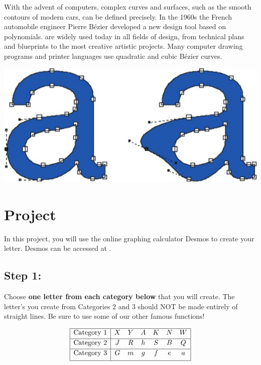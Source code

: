 \documentclass{ximera}
\begin{document}
With the advent of computers, complex curves and surfaces, such as the smooth contours of modern cars, can be defined precisely. In the 1960s the French automobile engineer Pierre Bézier developed a new design tool based on polynomials.  are widely used today in all fields of design, from technical plans and blueprints to the most creative artistic projects. Many computer drawing programs and printer languages use quadratic and cubic Bézier curves.

\begin{image}
\includegraphics[width=\textwidth]{letterA.jpg}
\end{image}

\section{Project}

In this project, you will use the online graphing calculator Desmos to create your letter.  Desmos can be accessed at .  

\subsection{Step 1:} Choose \textbf{one letter from each category below} that you will create.  The letter's you create from Categories 2 and 3 should NOT be made entirely of straight lines.  Be sure to use some of our other famous functions!


$$
 \begin{array}{|c | c c c c c c |} 
 \hline
 \text{Category 1} & X & Y & A & K & N & W \\ [0.5ex] 
 \hline
 \text{Category 2} & J & R & h & S & B & Q \\ [0.5ex] 
 \hline
 \text{Category 3} & G & m & g & f & e & a \\[1ex] 
 \hline
\end{array}
$$
\end{document}
